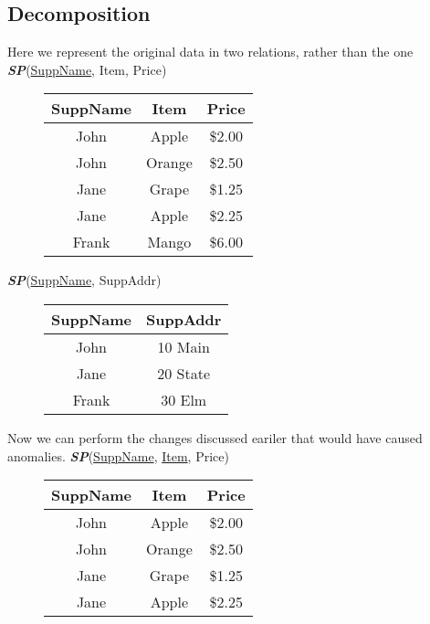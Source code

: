 \documentclass{report}
\begin{document}
          \subsection{Decomposition}
          Here we represent the original data in two relations, rather than the one
          \bigbreak \noindent
          \textit{\textbf{SP}}(\underline{SuppName}, Item, Price)
         \begin{figure}[ht]
         \centering
         \setlength{\tabcolsep}{39}
         \begin{tabular}{c c c}
         \hline
         \textbf{SuppName} & \textbf{Item} &\textbf{Price} \\
                   \hline
         John & Apple & \$2.00 \\
         \hline 
         John & Orange & \$2.50 \\
         \hline 
         Jane & Grape & \$1.25 \\
         \hline 
         Jane & Apple & \$2.25 \\
         \hline
         Frank & Mango & \$6.00 \\
         \hline
                   \end{tabular}
                   \end{figure} 
            \bigbreak \noindent
            \textit{\textbf{SP}}(\underline{SuppName}, SuppAddr)
        \begin{figure}[H]
        \centering
        \setlength{\tabcolsep}{39}
        \begin{tabular}{c c}
            \hline
            \textbf{SuppName} & \textbf{SuppAddr} \\
        \hline
        John & 10 Main \\
        \hline
        Jane & 20 State \\
        \hline
        Frank & 30 Elm \\
        \hline
    \end{tabular}
\end{figure}
\bigbreak \noindent
Now we can perform the changes discussed eariler that would have caused anomalies.
\bigbreak \noindent
\textit{\textbf{SP}}(\underline{SuppName}, \underline{Item}, Price)
    \begin{figure}[ht]
    \centering
      \setlength{\tabcolsep}{28}
    \begin{tabular}{c c c}
        \hline
        SuppName & Item & Price \\
    \hline
        John & Apple & \$2.00 \\
        \hline
        John & Orange & \$2.50 \\
        \hline
        Jane & Grape & \$1.25 \\
        \hline
        Jane & Apple & \$2.25 \\
        \hline
    \end{tabular}
    \end{figure}
\end{document}
